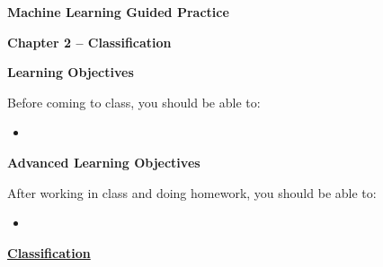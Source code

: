 \documentclass{wc_wksh}
\begin{document}
\begin{framed}
  \begin{center}
    \begin{large}
    \textbf{Machine Learning Guided Practice}

    \textbf{Chapter 2 -- Classification}
    \end{large}
    \end{center}
  \bigskip

  \textbf{Learning Objectives}

  Before coming to class, you should be able to:
  \begin{itemize}
   \item 
  \end{itemize}
  \bigskip

  \textbf{Advanced Learning Objectives}

  After working in class and doing homework, you should be able to:
  \begin{itemize}
    \item 
  \end{itemize}
 
\end{framed}

\newpage

\underline{\textbf{Classification}}
\end{document}
